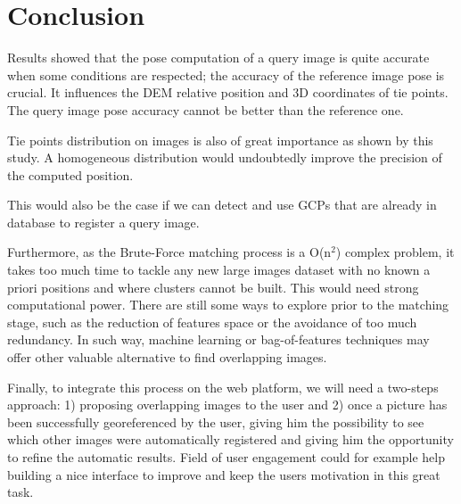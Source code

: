 \documentclass[fleqn,10pt]{wlpeerj} %
\begin{document}
\section*{Conclusion}
Results showed that the pose computation of a query image is quite accurate
when some conditions are respected;  the accuracy of the reference image
pose is crucial. It influences the DEM relative position and 3D coordinates of
tie points. The query image pose accuracy cannot be better than the reference one.

Tie points distribution on images is also of great importance as shown by this
study. A homogeneous distribution would undoubtedly improve the precision of the
computed position.

This would also be the case if we can detect and use GCPs that are already 
in database to register a query image. 

Furthermore, as the Brute-Force matching process is a O(n$^{2}$) complex problem, 
it takes too much time to tackle any new large images dataset with no known 
a priori positions and where clusters cannot be built. This would need strong
computational power.
There are still some ways to explore prior to the matching stage, such as 
the reduction of features space or the avoidance of too much redundancy.
In such way, machine learning or bag-of-features techniques may offer other 
valuable alternative to find overlapping images.


Finally, to integrate this process on the web platform, we will need a two-steps
approach: 1) proposing overlapping images to the user and 2) once a picture has 
been successfully georeferenced by the user, giving him the possibility to see
which other images were automatically registered and giving him the opportunity
to refine the automatic results. Field of user engagement could for example 
help building a nice interface to improve and keep the users motivation in this 
great task.





\end{document}
